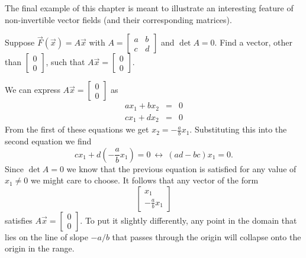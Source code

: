 \documentclass[../book.tex]{subfiles}
\begin{document}
The final example of this chapter is meant to illustrate an interesting feature of non-invertible vector fields (and their corresponding matrices).
\begin{example} \label{eg:non-invertible-matrix}
Suppose \(\vec{F}(\vec{x}) = A \vec{x}\) with \(A=\begin{bmatrix}a & b \\ c & d\end{bmatrix}\) and \(\det A = 0\). Find a vector, other than \(\begin{bmatrix} 0 \\ 0\end{bmatrix}\), such that \(A \vec{x} = \begin{bmatrix} 0 \\ 0\end{bmatrix}\).
\end{example}
\begin{solution}
We can express \(A \vec{x} = \begin{bmatrix} 0 \\ 0\end{bmatrix}\) as
\begin{equation}\label{eq:vec-44}
\begin{array}{lcl}
  a x_1 + b x_2 &=& 0 \\
  c x_1 + d x_2 &=& 0
\end{array}
\end{equation}
From the first of these equations we get \(x_2 = -\frac{a}{b}x_1\). Substituting this into the second equation we find
\begin{equation}\label{eq:vec-45}
c  x_1 + d (-\frac{a}{b} x_1) = 0
\ \leftrightarrow\ 
(ad - bc)  x_1 = 0.
\end{equation}
Since \(\det A = 0\) we know that the previous equation is satisfied for any value of \(x_1\neq 0\) we might care to choose. It follows that any vector of the form
\begin{equation}\label{eq:vec-46}
\begin{bmatrix}
  x_1 \\ - \frac{a}{b} x_1
\end{bmatrix}
\end{equation}
satisfies \(A \vec{x} = \begin{bmatrix} 0 \\ 0\end{bmatrix}\). To put it slightly differently, any point in the domain that lies on the line of slope \(-a/b\) that passes through the origin will collapse onto the origin in the range.
\end{solution}
\end{document}
